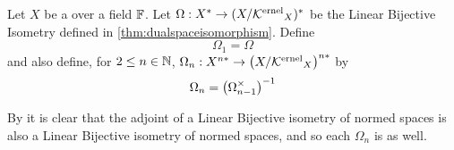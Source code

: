 \label{def:higherorderdualspaceisomorphism}
\newcommand{\NthDualSPaceIso}[1]{\textbf{\hyperref[def:higherorderdualspaceisomorphism]{\ensuremath{\pa{#1}^{th}} Dual Space Isomorphism}}\xspace}
\begin{df}
Let $X$ be a 
\SeminormedSpace
over a field
$\mathbb{F}$. 
Let $\Omega:X^* \to (X/\textbf{\ensuremath{\mathcal{K}\rm^{ernel}}}_X)^*$ 
be the 
Linear 
Bijective 
Isometry
defined in 
\ref{thm:dualspaceisomorphism}.
Define 
\begin{equation*}
\Omega_1=\Omega
\end{equation*}
and also define, for $2 \leq n \in \mathbb{N}$, 
$\Omega_n:X^{n*} \to \left( X/\textbf{\ensuremath{\mathcal{K}\rm^{ernel}}}_X\right)^{n*}$
by 
\begin{equation*}
\Omega_n=\left( \Omega_{n-1}^{\times}\right)^{-1}
\end{equation*}

By     
\label{prop:adjointoperator}
it is clear that the 
adjoint of a Linear Bijective isometry of normed spaces
is also a Linear Bijective isometry of normed spaces, and
so each $\Omega_n$ is as well. 

\end{df}
